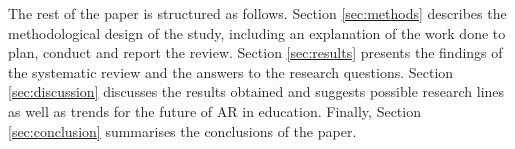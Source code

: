 % 	

The rest of the paper is structured as follows. Section \ref{sec:methods} describes the methodological design of the study, including an explanation of the work done to plan, conduct and report the review. Section \ref{sec:results} presents the findings of the systematic review and the answers to the research questions. Section \ref{sec:discussion} discusses the results obtained and suggests possible research lines as well as trends for the future of AR in education. Finally, Section \ref{sec:conclusion} summarises the conclusions of the paper.
